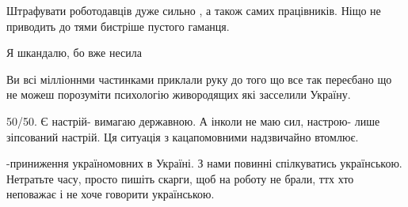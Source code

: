 \begin{itemize}
 
Штрафувати роботодавців дуже сильно , а також самих працівників. Ніщо не приводить до тями бистріше пустого гаманця.

 
Я шкандалю, бо вже несила

 

Ви всі мілліоннми частинками приклали руку до того що все так переєбано що не
можеш порозуміти психологію живородящих які засселили Україну.


 

50/50. Є настрій- вимагаю державною. А інколи не маю сил, настрою- лише
зіпсований настрій. Ця ситуація з кацапомовними надзвичайно втомлює.


 

-приниження україномовних в Україні. З нами повинні спілкуватись українською.
Нетратьте часу, просто пишіть скарги, щоб на роботу не брали, ттх хто неповажає
і не хоче говорити українською.

 

\end{itemize}
